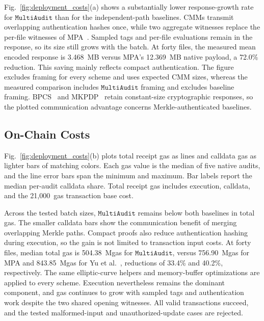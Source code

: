 \documentclass[lettersize,journal]{IEEEtran}
\newcommand{\MultiAudit}{\ensuremath{\mathtt{MultiAudit}}}
\begin{document}
Fig.~\ref{fig:deployment_costs}(a) shows a substantially lower response-growth rate for \MultiAudit{} than for the independent-path baselines. CMMs transmit overlapping authentication hashes once, while two aggregate witnesses replace the per-file witnesses of MPA~\cite{XuTIFS26}. Sampled tags and per-file evaluations remain in the response, so its size still grows with the batch. At forty files, the measured mean encoded response is 3.468~MB versus MPA's 12.369~MB native payload, a 72.0\% reduction. This saving mainly reflects compact authentication. The figure excludes framing for every scheme and uses expected CMM sizes, whereas the measured comparison includes \MultiAudit{} framing and excludes baseline framing. BPCS~\cite{ZhangTPDS23} and MKPDP~\cite{MiaoSCIS2026} retain constant-size cryptographic responses, so the plotted communication advantage concerns Merkle-authenticated baselines.

\subsection{On-Chain Costs}
\label{subsec:onchain_costs}

Fig.~\ref{fig:deployment_costs}(b) plots total receipt gas as lines and calldata gas as lighter bars of matching colors. Each gas value is the median of five native audits, and the line error bars span the minimum and maximum. Bar labels report the median per-audit calldata share. Total receipt gas includes execution, calldata, and the 21,000~gas transaction base cost.





Across the tested batch sizes, \MultiAudit{} remains below both baselines in total gas. The smaller calldata bars show the communication benefit of merging overlapping Merkle paths. Compact proofs also reduce authentication hashing during execution, so the gain is not limited to transaction input costs. At forty files, median total gas is 504.38~Mgas for \MultiAudit{}, versus 756.90~Mgas for MPA and 843.85~Mgas for Yu et al.~\cite{YuTC25}, reductions of 33.4\% and 40.2\%, respectively. The same elliptic-curve helpers and memory-buffer optimizations are applied to every scheme. Execution nevertheless remains the dominant component, and gas continues to grow with sampled tags and authentication work despite the two shared opening witnesses. All valid transactions succeed, and the tested malformed-input and unauthorized-update cases are rejected.
\end{document}
